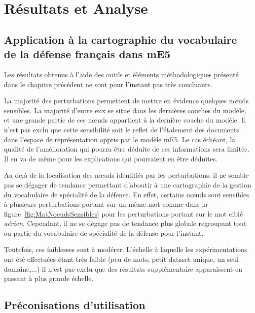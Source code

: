 
\section{Résultats et Analyse}

    \subsection{Application à la cartographie du vocabulaire de la défense français dans mE5}

        Les résultats obtenus à l'aide des outils et éléments méthodologiques présenté dans le chapitre précédent ne sont pour l'instant pas très concluants. 
        
        La majorité des perturbations permettent de mettre en évidence quelques nœuds sensibles. La majorité d'entre eux se situe dans les dernières couches du modèle, et une grande partie de ces nœuds appartient à la dernière couche du modèle. Il n'est pas exclu que cette sensibilité soit le reflet de l'étalement des documents dans l'espace de représentation appris par le modèle mE5. Le cas échéant, la qualité de l'amélioration qui pourra être déduite de ces informations sera limitée. Il en va de même pour les explications qui pourraient en être déduites.

        Au delà de la localisation des nœuds identifiés par les perturbations, il ne semble pas se dégager de tendance permettant d'aboutir à une cartographie de la gestion du vocabulaire de spécialité de la défense. En effet, certains nœuds sont sensibles à plusieurs perturbations portant sur un même mot comme  dans la figure~\ref{fig:MatNoeudsSensibles} pour les perturbations portant sur le mot ciblé \textit{aérien}. Cependant, il ne se dégage pas de tendance plus globale regroupant tout ou partie du vocabulaire de spécialité de la défense pour l'instant. 

        Toutefois, ces faiblesses sont à modérer. L'échelle à laquelle les expérimentations ont été effectuées étant très faible (peu de mots, petit dataset unique, un seul domaine,...) il n'est pas exclu que des résultats supplémentaire apparaissent en passant à plus grande échelle.

    \subsection{Préconisations d'utilisation}


